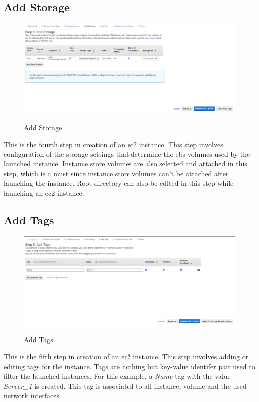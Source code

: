 \documentclass{home_assignment}
\begin{document}
\subsection{Add Storage}
\begin{figure}[H]
    \centering
    \includegraphics[frame,width=\linewidth]{../Figures/d.png}
    \label{fig:d}
    \caption{Add Storage}
\end{figure}
This is the fourth step in creation of an \acrshort{ec2} instance. This step involves configuration of the storage settings that determine the \acrshort{ebs} volumes used by the launched instance. Instance store volumes are also selected and attached in this step, which is a must since instance store volumes can't be attached after launching the instance. Root directory can also be edited in this step while launching an \acrshort{ec2} instance.


\subsection{Add Tags}
\begin{figure}[H]
    \centering
    \includegraphics[frame,width=\linewidth]{../Figures/e.png}
    \label{fig:e}
    \caption{Add Tags}
\end{figure}
This is the fifth step in creation of an \acrshort{ec2} instance. This step involves adding or editing tags for the instance. Tags are nothing but key-value identifer pair used to filter the launched instances. For this example, a \textit{Name} tag with the value \textit{Server\_1} is created. This tag is associated to all instance, volume and the used network interfaces.
 
\end{document}
